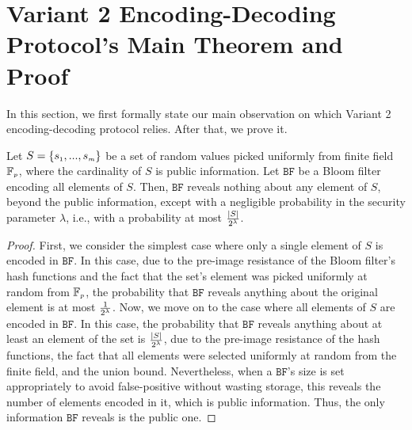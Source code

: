 

\section{Variant 2 Encoding-Decoding Protocol's Main Theorem and Proof}\label{sec::Variant-2-Theorem-proof}

In this section, we first formally state our main observation on which Variant 2 encoding-decoding protocol relies. After that, we prove it.


\begin{theorem}
Let  $S=\{s_{\scriptscriptstyle 1},..., s_{\scriptscriptstyle m}\}$ be a set of random values picked uniformly from finite field $\mathbb{F}_{\scriptscriptstyle p}$, where the cardinality of $S$ is public information. Let $\mathtt{BF}$ be a Bloom filter encoding all elements of   $S$. Then,  $\mathtt{BF}$ reveals nothing about any element of $S$, beyond the public information, except with a negligible probability in the security parameter $\lambda$, i.e., with a probability at most $\frac{|S|}{2^{\scriptscriptstyle \lambda}}$. 
\end{theorem}

\begin{proof}
First, we consider the simplest case where only a single element of $S$ is encoded in $\mathtt{BF}$. In this case, due to the pre-image resistance of the Bloom filter's hash functions and the fact that the set's element was picked uniformly at random from $\mathbb{F}_{\scriptscriptstyle p}$, the probability that $\mathtt{BF}$ reveals anything about the original element is at most $\frac{1}{2^{\scriptscriptstyle \lambda}}$. Now, we move on to the case where all elements of $S$ are encoded in $\mathtt{BF}$. In this case, the probability that $\mathtt{BF}$ reveals anything about at least an element of the set is $\frac{|S|}{2^{\scriptscriptstyle \lambda}}$, due to the pre-image resistance of the hash functions,  the fact that all elements were selected uniformly at random from the finite field, and the union bound. Nevertheless, when a $\mathtt{BF}$'s size is set appropriately to avoid false-positive without wasting storage, this reveals the number of elements encoded in it, which is public information.  Thus, the only information $\mathtt{BF}$ reveals is the public one.  
\end{proof}